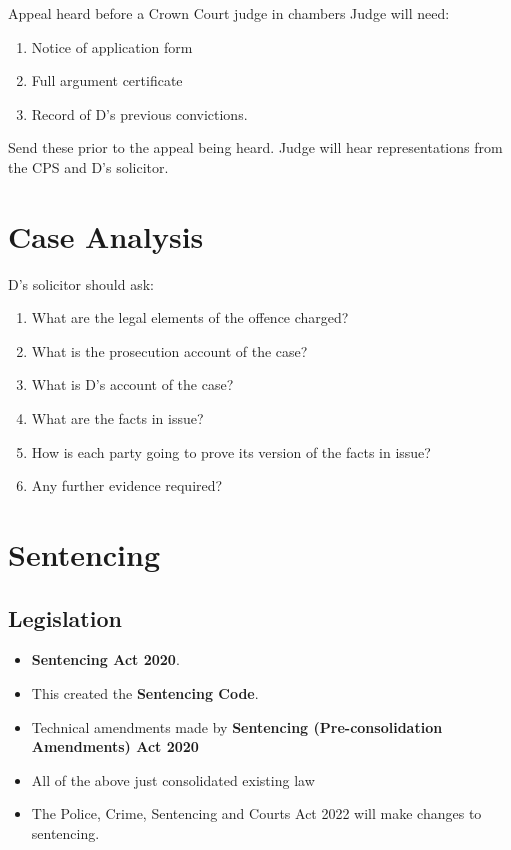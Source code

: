 \documentclass[
]{article}
\providecommand{\tightlist}{%
  \setlength{\itemsep}{0pt}\setlength{\parskip}{0pt}}
\begin{document}
Appeal heard before a Crown Court judge in chambers Judge will need:

\begin{enumerate}
\def\labelenumi{\arabic{enumi}.}
\tightlist
\item
  Notice of application form
\item
  Full argument certificate
\item
  Record of D's previous convictions.
\end{enumerate}

Send these prior to the appeal being heard. Judge will hear
representations from the CPS and D's solicitor.

\hypertarget{case-analysis}{%
\section{Case Analysis}\label{case-analysis}}

D's solicitor should ask:

\begin{enumerate}
\def\labelenumi{\arabic{enumi}.}
\tightlist
\item
  What are the legal elements of the offence charged?
\item
  What is the prosecution account of the case?
\item
  What is D's account of the case?
\item
  What are the facts in issue?
\item
  How is each party going to prove its version of the facts in issue?
\item
  Any further evidence required?
\end{enumerate}

\hypertarget{sentencing}{%
\section{Sentencing}\label{sentencing}}

\hypertarget{legislation}{%
\subsection{Legislation}\label{legislation}}

\begin{itemize}
\tightlist
\item
  \textbf{Sentencing Act 2020}.
\item
  This created the \textbf{Sentencing Code}.
\item
  Technical amendments made by \textbf{Sentencing (Pre-consolidation
  Amendments) Act 2020}
\item
  All of the above just consolidated existing law
\item
  The Police, Crime, Sentencing and Courts Act 2022 will make changes to
  sentencing.
\end{itemize}
\end{document}
